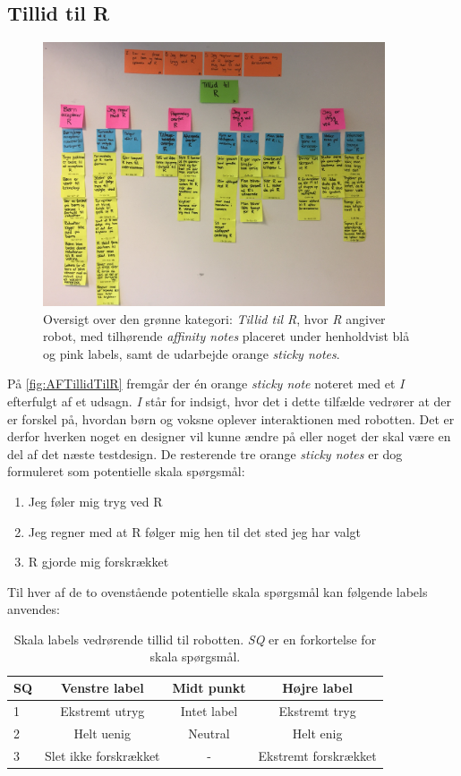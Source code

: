 \subsection*{Tillid til R}
%
\begin{figure}[H]
\centering
\includegraphics[width = 0.9\textwidth]{Figure/AffinityDiagram/TillidTilR} 
\caption{Oversigt over den grønne kategori: \textit{Tillid til R}, hvor \textit{R} angiver robot, med tilhørende \textit{affinity notes} placeret under henholdvist blå og pink labels, samt de udarbejde orange \textit{sticky notes}.}
\label{fig:AFTillidTilR}
\end{figure}
\noindent
%
På \autoref{fig:AFTillidTilR} fremgår der én orange \textit{sticky note} noteret med et \textit{I} efterfulgt af et udsagn. \textit{I} står for indsigt, hvor det i dette tilfælde vedrører at der er forskel på, hvordan børn og voksne oplever interaktionen med robotten. Det er derfor hverken noget en designer vil kunne ændre på eller noget der skal være en del af det næste testdesign. De resterende tre orange \textit{sticky notes} er dog formuleret som potentielle skala spørgsmål: \blankline
%
\begin{enumerate}
  \item Jeg føler mig tryg ved R
  \item Jeg regner med at R følger mig hen til det sted jeg har valgt
  \item R gjorde mig forskrækket\blankline
\end{enumerate}
%
Til hver af de to ovenstående potentielle skala spørgsmål kan følgende labels anvendes:
%
\begin{table}[H]
	\centering 
	\begin{tabular}{l|c|c|c}
		SQ  & Venstre label & Midt punkt & Højre label \\\hline
		1   & Ekstremt utryg & Intet label & Ekstremt tryg  \\\hline
		2   & Helt uenig & Neutral & Helt enig \\ \hline
		3   & Slet ikke forskrækket & -  & Ekstremt forskrækket 
	\end{tabular} 
	\caption{Skala labels vedrørende tillid til robotten. \textit{SQ} er en forkortelse for skala spørgsmål.}
	\label{tab:TillidSkala}       
\end{table}
